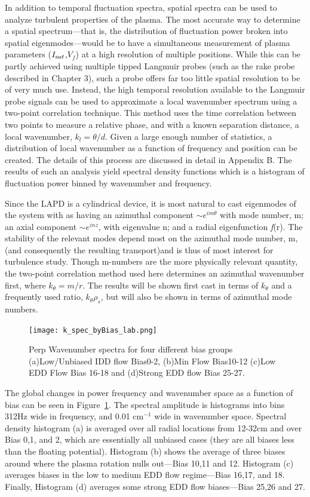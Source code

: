 \documentclass[aip,pop,amsmath,amssymb,reprint,superscriptaddress]{revtex4-1} %
\begin{document}
In addition to temporal fluctuation spectra, spatial spectra can be used to analyze turbulent properties of the plasma. The most accurate way to determine a spatial spectrum---that is, the distribution of fluctuation power broken into spatial eigenmodes---would be to have a simultaneous measurement of plasma parameters ($I_{\text sat}$,$V_{f}$) at a high resolution of multiple positions. While this can be partly achieved using multiple tipped Langmuir probes (such as the rake probe described in Chapter 3), such a probe offers far too little spatial resolution to be of very much use.  Instead, the high temporal resolution available to the Langmuir probe signals can be used to approximate a local wavenumber spectrum using a two-point correlation technique. This method uses the time correlation between two points to measure a relative phase, and with a known separation distance, a local wavenumber, $k_{l} = \theta/d$. Given a large enough number of statistics, a distribution of local wavenumber as a function of frequency and position can be created. The details of this process are discussed in detail in Appendix B. The results of such an analysis yield spectral density functions which is a histogram of fluctuation power binned by wavenumber and frequency. 

Since the LAPD is a cylindrical device, it is most natural to cast eigenmodes of the system with as having an azimuthal component $\sim e^{im \theta}$ with mode number, m; an axial component $\sim e^{inz}$, with eigenvalue n; and a radial eigenfunction \textit{f}(r). The stability of the relevant modes depend most on the azimuthal mode number, m, (and consequently the resulting transport)and is thus of most interest for turbulence study. Though m-numbers are the more physically relevant quantity, the two-point correlation method used here determines an azimuthal wavenumber first, where $k_{\theta} = m/r$. The results will be shown first cast in terms of $k_{\theta}$ and a frequently used ratio, $k_{\theta}\rho_{s}$, but will also be shown in terms of azimuthal mode numbers.

\begin{figure}[!htbp]
\centerline{
\texttt{[image: k\_spec\_byBias\_lab.png]}}
\caption{\label{fig:k_spec_byBias_lab} Perp Wavenumber spectra for four  different bias groups (a)Low/Unbiased IDD flow Bias0-2, (b)Min Flow Bias10-12 (c)Low EDD Flow Bias 16-18 and (d)Strong EDD flow Bias 25-27.}
\end{figure}

The global changes in power frequency and wavenumber space as a function of bias can be seen in Figure~\ref{fig:k_spec_byBias_lab}. The spectral amplitude is histograms into bins 312Hz wide in frequency, and 0.01 $\text{cm}^{-1}$ wide in wavenumber space. Spectral density histogram (a) is averaged over all radial locations from 12-32cm and over Bias 0,1, and 2, which are essentially all unbiased cases (they are all biases less than the floating potential). Histogram (b) shows the average of three biases around where the plasma rotation nulls out---Bias 10,11 and 12. Histogram (c) averages biases in the low to medium EDD flow regime---Bias 16,17, and 18. Finally, Histogram (d) averages some strong EDD flow biases---Bias 25,26 and 27. 
\end{document}
